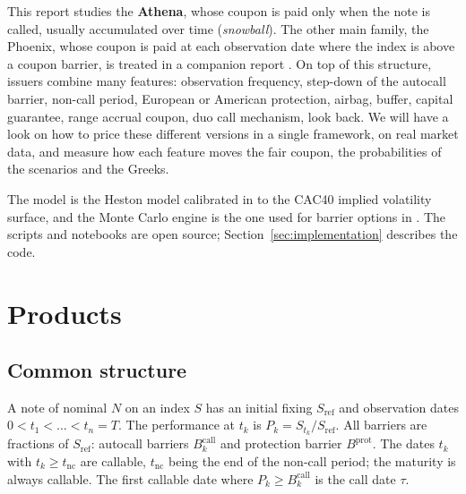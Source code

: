 \documentclass[11pt,a4paper]{article}
\newcommand{\Sref}{S_{\mathrm{ref}}}
\begin{document}
This report studies the \textbf{Athena}, whose coupon is paid only when the note is called, usually accumulated
over time (\emph{snowball}). The other main family, the Phoenix, whose coupon is paid at each observation date where
the index is above a coupon barrier, is treated in a companion report \cite{benguedda2026phoenix}.
On top of this structure, issuers combine many features: observation frequency, step-down of the autocall barrier,
non-call period, European or American protection, airbag, buffer, capital guarantee, range accrual coupon, duo call mechanism, look back. We will have a look on how to price these different versions in a single framework, on real market data, and measure how each feature moves the fair coupon, the probabilities of the scenarios and the Greeks.

The model is the Heston model calibrated in \cite{benguedda2026heston} to the CAC40 implied volatility surface, and the Monte Carlo engine is the one used for barrier options in \cite{benguedda2026barrier}. The scripts and
notebooks are open source; Section~\ref{sec:implementation} describes the code.

\section{Products}\label{sec:products}

\subsection{Common structure}
A note of nominal $N$ on an index $S$ has an initial fixing $\Sref$ and observation dates
$0 < t_1 < \dots < t_n = T$. The performance at $t_k$ is $P_k = S_{t_k}/\Sref$. All barriers are fractions of
$\Sref$: autocall barriers $B^{\mathrm{call}}_k$ and protection barrier $B^{\mathrm{prot}}$. The dates $t_k$ with $t_k \ge t_{\mathrm{nc}}$ are callable, $t_{\mathrm{nc}}$ being the
end of the non-call period; the maturity is always callable. The first callable date where
$P_k \ge B^{\mathrm{call}}_k$ is the call date $\tau$.
\end{document}
